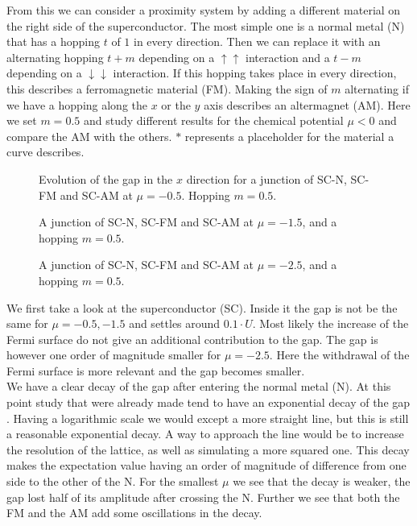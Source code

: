 \documentclass[..\main.tex]{subfile}
\begin{document}
From this we can consider a proximity system by adding a different material on the right side of the superconductor. 
The most simple one is a normal metal (N) that has a hopping $t$ of $1$ in every direction.
Then we can replace it with an alternating hopping $t+m$ depending on a $\uparrow\uparrow$ interaction
and a $t-m$ depending on a $\downarrow\downarrow$ interaction. If this hopping takes place in every direction, this describes a ferromagnetic material (FM).
Making the sign of $m$ alternating if we have a hopping along the $x$ or the $y$ axis describes an altermagnet (AM).
Here we set $m=0.5$ and study different results for the chemical potential $\mu<0$ and compare the AM
with the others. $\ast$ represents a placeholder for the material a curve describes.\\
\begin{figure}[H]
  \centering
  
  \caption{Evolution of the gap in the $x$ direction for a junction of SC-N, SC-FM and SC-AM at $\mu=-0.5$. Hopping $m=0.5$.}
  \label{fig:SC_START_Mu-0.5}
\end{figure}\begin{figure}[H]
  \centering
  
  \caption{A junction of SC-N, SC-FM and SC-AM at $\mu=-1.5$, and a hopping $m=0.5$.}
  \label{fig:SC_START_Mu-1.5}
\end{figure}
\begin{figure}[H]
  \centering
  
  \caption{A junction of SC-N, SC-FM and SC-AM at $\mu=-2.5$, and a hopping $m=0.5$.}
    \label{fig:SC_START_Mu-2.5}
\end{figure}
We first take a look at the superconductor (SC). Inside it the gap is not be the same for $\mu=-0.5,-1.5$
and settles around $0.1\cdot U$. Most likely the increase of the Fermi surface do not give an additional contribution to the gap.
The gap is however one order of magnitude smaller for $\mu=-2.5$. Here the withdrawal of the Fermi surface is more relevant and the 
gap becomes smaller.\\
We have a clear decay of the gap after entering the normal metal (N). At this point 
study that were already made tend to have an exponential decay of the gap \cite{Mjos2019}. Having a logarithmic scale we would
except a more straight line, but this is still a reasonable exponential decay. A way to approach the line would be to increase the 
resolution of the lattice, as well as simulating a more squared one. This decay makes the expectation value having an order of 
magnitude of difference from one side to the other of the N. For the smallest $\mu$ we see that the decay is weaker, the gap lost
half of its amplitude after crossing the N. Further we see that both the FM and the AM add some oscillations in the decay. \\
\end{document}
